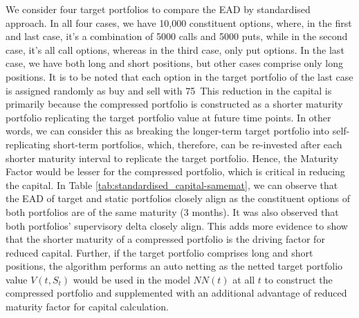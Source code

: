\noindent We consider four target portfolios to compare the EAD by standardised approach. In all four cases, we have 10,000 constituent options, where, in the first and last case, it's a combination of 5000 calls and 5000 puts, while in the second case, it's all call options, whereas in the third case, only put options. In the last case, we have both long and short positions, but other cases comprise only long positions. It is to be noted that each option in the target portfolio of the last case is assigned randomly as buy and sell with 75\
\noindent This reduction in the capital is primarily because the compressed portfolio is constructed as a shorter maturity portfolio replicating the target portfolio value at future time points. In other words, we can consider this as breaking the longer-term target portfolio into self-replicating short-term portfolios, which, therefore, can be re-invested after each shorter maturity interval to replicate the target portfolio. Hence, the Maturity Factor would be lesser for the compressed portfolio, which is critical in reducing the capital. In Table \ref{tab:standardised_capital-samemat}, we can observe that the EAD of target and static portfolios closely align as the constituent options of both portfolios are of the same maturity (3 months). It was also observed that both portfolios' supervisory delta closely align. This adds more evidence to show that the shorter maturity of a compressed portfolio is the driving factor for reduced capital. Further, if the target portfolio comprises long and short positions, the algorithm performs an auto netting as the netted target portfolio value $V(t, S_t)$ would be used in the model $NN(t)$ at all $t$ to construct the compressed portfolio and supplemented with an additional advantage of reduced maturity factor for capital calculation.  



